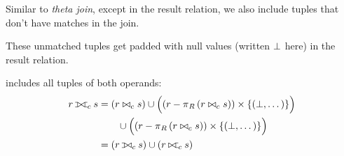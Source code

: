 \begin{multicols}{2}
\begin{CheatsheetEntryFrame}
        \newcommand{\RelAlgVennDiagram}[3]{%
            \begin{tikzpicture}[scale=0.4, transform shape]
                \begin{scope} %
                    \clip
                        (-1, -1) rectangle (2.2, 1)
                        (1.2, 0) circle (1)
                    ;
                    \fill[#1] (0, 0) circle (1);
                \end{scope}
                \begin{scope} %
                    \clip (1.2, 0) circle (1);
                    \fill[#2] (0, 0) circle (1);
                \end{scope}
                \begin{scope} %
                    \clip
                        (-1, -1) rectangle (2.2, 1)
                        (0, 0) circle (1)
                    ;
                    \fill[#3] (1.2, 0) circle (1);
                \end{scope}
                \begin{scope} %
                    \draw[line width=2.0pt]
                        (1.2, 0) circle (1)
                        (0, 0) circle (1)
                    ;
                \end{scope}
            \end{tikzpicture}%
        }

         \MarkExtendedRelAlg

        Similar to \textit{theta join}, except in the result relation, we also include tuples that don't have matches in the join.

        These unmatched tuples get padded with null values (written $\mathord{\bot}$ here) in the result relation.


        \vspace{\TextExtraSkip}%
        \textit{} includes all tuples of both operands:
        \begin{align*}
            r \relfullouterjoin_c s &=
                (r \bowtie_c s)
                \cup \parens*{\vphantom{\frac{x}{x}}
                    \parens*{r - \relproject_R{(r \bowtie_c s)}}
                    \times \braces*{(\relnullvalue, \dots)}
                } \\
            &
                \qquad
                \cup \parens*{\vphantom{\frac{x}{x}}
                    \parens*{r - \relproject_R{(r \bowtie_c s)}}
                    \times \braces*{(\relnullvalue, \dots)}
                } \\
            &= (r \relleftouterjoin_c s) \cup (r \relrightouterjoin_c s)
        \end{align*}


\end{CheatsheetEntryFrame}
\end{multicols}

